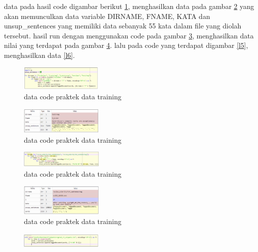\begin{enumerate}
        data pada hasil code digambar berikut \ref{l1}, menghasilkan data pada gambar \ref{l2} yang akan memunculkan data variable DIRNAME, FNAME, KATA dan unsup\_sentences yang memiliki data sebanyak 55 kata dalam file yang diolah tersebut. hasil run dengan menggunakan code pada gambar \ref{l3}, menghasilkan data nilai yang terdapat pada gambar \ref{l4}. lalu pada code yang terdapat digambar \ref{l5}, menghasilkan data \ref{l6}.
        \begin{figure}[H]
            \includegraphics[width=4cm]{figures/1174040/chapter5/17.png}
            \centering
            \caption{data code praktek data training }
            \label{l1}
        \end{figure}
        \begin{figure}[H]
            \includegraphics[width=4cm]{figures/1174040/chapter5/18.png}
            \centering
            \caption{data code praktek data training }
            \label{l2}
        \end{figure}
        \begin{figure}[H]
            \includegraphics[width=4cm]{figures/1174040/chapter5/19.png}
            \centering
            \caption{data code praktek data training }
            \label{l3}
        \end{figure}
        \begin{figure}[H]
            \includegraphics[width=4cm]{figures/1174040/chapter5/20.png}
            \centering
            \caption{data code praktek data training }
            \label{l4}
        \end{figure}
        \begin{figure}[H]
            \includegraphics[width=4cm]{figures/1174040/chapter5/21.png}

\end{figure}
\end{enumerate}
